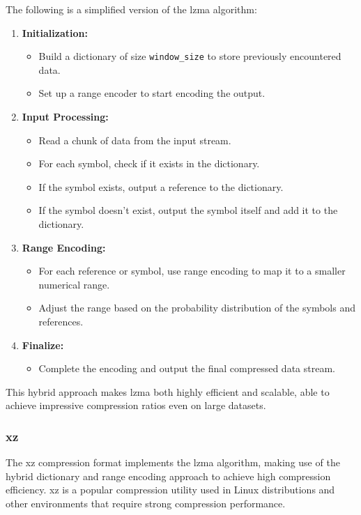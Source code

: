 \documentclass{ioereport}
\begin{document}
    The following is a simplified version of the \gls{lzma} algorithm:
    \begin{enumerate}[label=\textbf{\roman*.}]
        \item \textbf{Initialization:}
        \begin{itemize}
            \item Build a dictionary of size \texttt{window\_size} to store previously encountered data.
            \item Set up a range encoder to start encoding the output.
        \end{itemize}
        \item \textbf{Input Processing:}
        \begin{itemize}
            \item Read a chunk of data from the input stream.
            \item For each symbol, check if it exists in the dictionary.
            \item If the symbol exists, output a reference to the dictionary.
            \item If the symbol doesn't exist, output the symbol itself and add it to the dictionary.
        \end{itemize}
        \item \textbf{Range Encoding:}
        \begin{itemize}
            \item For each reference or symbol, use range encoding to map it to a smaller numerical range.
            \item Adjust the range based on the probability distribution of the symbols and references.
        \end{itemize}
        \item \textbf{Finalize:}
        \begin{itemize}
            \item Complete the encoding and output the final compressed data stream.
        \end{itemize}
    \end{enumerate}

    This hybrid approach makes \gls{lzma} both highly efficient and scalable, able to achieve impressive compression ratios even on large datasets.

    \subsubsection{xz}
    The xz compression format implements the \gls{lzma} algorithm, making use of the hybrid dictionary and range encoding approach to achieve high compression efficiency. xz is a popular compression utility used in Linux distributions and other environments that require strong compression performance.
\end{document}
